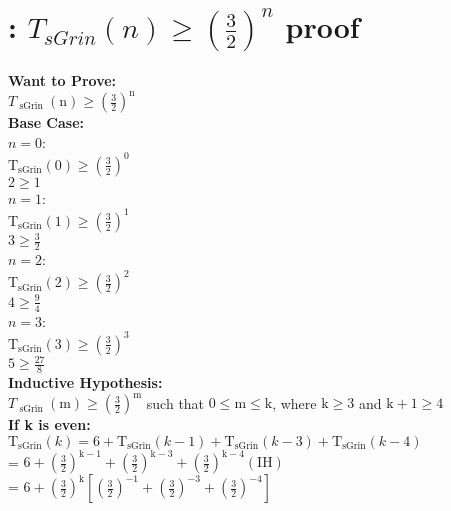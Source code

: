 \documentclass{article}
\begin{document}
    \section{: $T_{sGrin}(n) \geq (\frac{3}{2})^n$ proof}
    \textbf{Want to Prove:}
    \\\indent\indent$T_{\text { sGrin }}(\mathrm{n}) \geq\left(\frac{3}{2}\right)^{\mathrm{n}}$
    \\\textbf{Base Case:}
    \\\indent\indent$n=0$:
    \\\indent\indent\indent\indent$\mathrm{T}_{\mathrm{sGrin}}(0) \geq\left(\frac{3}{2}\right)^{0}$
    \\\indent\indent\indent\indent$2 \geq 1$
    \\\indent\indent$n=1$:
    \\\indent\indent\indent\indent$\mathrm{T}_{\mathrm{sGrin}}(1) \geq\left(\frac{3}{2}\right)^{1}$
    \\\indent\indent\indent\indent$3 \geq \frac{3}{2}$
    \\\indent\indent$n=2$:
    \\\indent\indent\indent\indent$\mathrm{T}_{\mathrm{sGrin}}(2) \geq\left(\frac{3}{2}\right)^{2}$
    \\\indent\indent\indent\indent$4 \geq \frac{9}{4}$
    \\\indent\indent$n=3$:
    \\\indent\indent\indent\indent$\mathrm{T}_{\mathrm{sGrin}}(3) \geq\left(\frac{3}{2}\right)^{3}$
    \\\indent\indent\indent\indent$5 \geq \frac{27}{8}$
    \\\textbf{Inductive Hypothesis:}
    \\\indent\indent$T_{\text { sGrin }}(\mathrm{m}) \geq\left(\frac{3}{2}\right)^{\mathrm{m}}$ such that $0 \leq \mathrm{m} \leq \mathrm{k}$, where $\mathrm{k} \geq 3$ and $\mathrm{k}+1 \geq 4$
    \\\textbf{If k is even:}
    \\\indent\indent$\mathrm{T}_{\mathrm{sGrin}}(k)=6+\mathrm{T}_{\mathrm{sGrin}}(k-1)+\mathrm{T}_{\mathrm{sGrin}}(k-3)+\mathrm{T}_{\mathrm{sGrin}}(k-4)$
    \\\indent\indent\indent\indent\indent= $6+\left(\frac{3}{2}\right)^{\mathrm{k}-1}+\left(\frac{3}{2}\right)^{\mathrm{k}-3}+\left(\frac{3}{2}\right)^{\mathrm{k}-4}(\mathrm{IH})$
    \\\indent\indent\indent\indent\indent= $6+\left(\frac{3}{2}\right)^{\mathrm{k}}\left[\left(\frac{3}{2}\right)^{-1}+\left(\frac{3}{2}\right)^{-3}+\left(\frac{3}{2}\right)^{-4}\right]$
\end{document}
